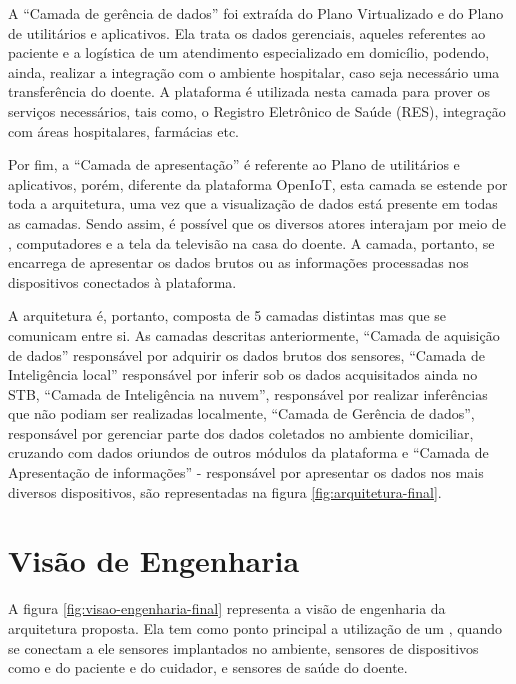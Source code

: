 A ``Camada de gerência de dados'' foi extraída do Plano Virtualizado e do
Plano de utilitários e aplicativos. Ela trata os dados gerenciais, aqueles
referentes ao paciente e a logística de um atendimento especializado em
domicílio, podendo, ainda, realizar a integração com o ambiente hospitalar, caso
seja necessário uma transferência do doente. A plataforma \nextsaude[]
é utilizada nesta camada para prover os serviços necessários, tais como, o 
Registro Eletrônico de Saúde (RES), integração com áreas hospitalares, farmácias etc.


Por fim, a ``Camada de apresentação'' é referente ao Plano de utilitários e
aplicativos, porém, diferente da plataforma OpenIoT, esta camada se estende por
toda a arquitetura, uma vez que a visualização de dados está presente em todas 
as camadas. Sendo assim, é possível que os diversos atores interajam por meio de
\smartphones, computadores e a tela da televisão na casa do doente.
A camada, portanto, se encarrega de apresentar os dados brutos ou as informações
processadas nos dispositivos conectados à plataforma. 

A arquitetura é, portanto, composta de 5 camadas distintas mas que se comunicam
entre si. As camadas descritas anteriormente, ``Camada de aquisição de
dados'' responsável por adquirir os dados brutos dos sensores, ``Camada de
Inteligência local'' responsável por inferir sob os dados acquisitados ainda no
STB, ``Camada de Inteligência na nuvem'', responsável por realizar
inferências que não podiam ser realizadas localmente, ``Camada de Gerência
de dados'', responsável por gerenciar parte dos dados coletados no ambiente
domiciliar, cruzando com dados oriundos de outros módulos da plataforma
\nextsaude[] e ``Camada de Apresentação de informações'' - responsável por
apresentar os dados nos mais diversos dispositivos, são representadas na figura
\ref{fig:arquitetura-final}.


\section{Visão de Engenharia} \label{sec:visao-engenharia}

A figura \ref{fig:visao-engenharia-final} representa a visão de engenharia da arquitetura
proposta. Ela tem como ponto principal a utilização de um \stb[], quando se
conectam a ele sensores  implantados no ambiente, sensores de dispositivos como
\smartphones[] e  \smartwatches[] do paciente e do cuidador, e sensores de saúde 
do doente.

